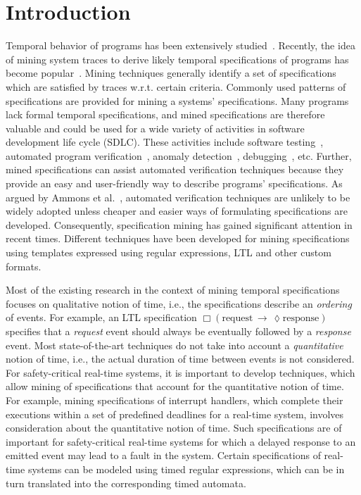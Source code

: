 \documentclass[]{sigplanconf}
\begin{document}
\section{Introduction}
Temporal behavior of programs has been extensively studied~\cite{lamport1978time, dwyer1999patterns}. Recently, the idea of mining system traces to derive likely temporal specifications of programs has become popular~\cite{lemieux2015general}. Mining techniques generally identify a set of specifications which are satisfied by traces w.r.t. certain criteria. Commonly used patterns of specifications are provided for mining a systems' specifications. Many programs lack formal temporal specifications, and mined specifications are therefore valuable and could be used for a wide variety of activities in software development life cycle (SDLC). These activities include software testing~\cite{dallmeier2010generating}, automated program verification~\cite{kincaid2015automated}, anomaly detection~\cite{christodorescu2008mining}, debugging~\cite{gabel2010online}, etc. Further, mined specifications can assist automated verification techniques because they provide an easy and user-friendly way to describe programs' specifications. As argued by Ammons et al.~\cite{DBLP:conf/popl/AmmonsBL02}, automated verification techniques are unlikely to be widely adopted unless cheaper and easier ways of formulating specifications are developed. Consequently, specification mining has gained significant attention in recent times. Different techniques have been developed for mining specifications using templates expressed using regular expressions, LTL and other custom formats.

Most of the existing research in the context of mining temporal specifications focuses on qualitative notion of time, i.e., the specifications describe an \emph{ordering} of events. For example, an LTL specification $\Box(\mathrm{request}\,\rightarrow\,\lozenge \mathrm{response})$ specifies that a \emph{request} event should always be eventually followed by a \emph{response} event. Most state-of-the-art techniques do not take into account a \emph{quantitative} notion of time, i.e., the actual duration of time between events is not considered. For safety-critical real-time systems, it is important to develop techniques, which allow mining of specifications that account for the quantitative notion of time. For example, mining specifications of interrupt handlers, which complete their executions within a set of predefined deadlines for a real-time system, involves consideration about the quantitative notion of time. Such specifications are of important for safety-critical real-time systems for which a delayed response to an emitted event may lead to a fault in the system. Certain specifications of real-time systems can be modeled using timed regular expressions, which can be in turn translated into the corresponding timed automata.
\end{document}
